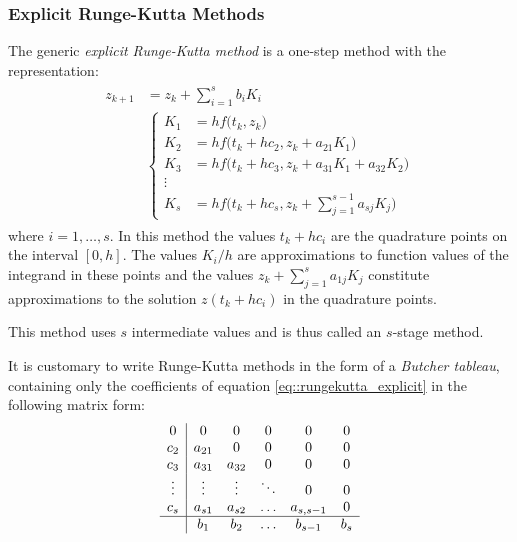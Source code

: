 \subsubsection{Explicit Runge-Kutta Methods}
The generic \textit{explicit Runge-Kutta method} is a one-step method with the representation:
\begin{equation}
	\begin{split}
	\begin{aligned}
		z_{k+1} &= z_k + \sum_{i=1}^{s}b_iK_i \\
		&\begin{cases}
		K_1 &= hf\Big(t_k,z_k\Big) \\[1em]
		K_2 &= hf\Big(t_k+hc_2,z_k + a_{21}K_1\Big) \\[1em]
		K_3 &= hf\Big(t_k+hc_3,z_k + a_{31}K_1 + a_{32}K_2\Big) \\[1em]
		\vdots \\[1em]
		K_s &= hf\Big(t_k+hc_s,z_k + \displaystyle\sum_{j=1}^{s-1}a_{sj}K_j\Big)
		\end{cases}
	\end{aligned}
	\end{split}
	\label{eq::rungekutta_explicit}
\end{equation}
where $i=1,\dots,s$. In this method the values $t_k+hc_i$
are the quadrature points on the interval $[0, h]$.
The values $K_i/h$ are approximations to function values of the
integrand in these points and the values $z_k + \displaystyle\sum_{j=1}^{s}a_{1j}K_j$ constitute
approximations to the solution $z(t_k+hc_i)$ in the quadrature points.

This method uses $s$ intermediate values and is thus called an $s$-stage method.

\begin{definition}
	It is customary to write Runge-Kutta methods in the
	form of a \textit{Butcher tableau}, containing only
	the coefficients of equation \ref{eq::rungekutta_explicit}
	in the following matrix form:
	\begin{equation*}
		\begin{array}
			{c|ccccc}
			0      &  0     & 0      & 0      & 0         & 0 \\
			c_2    & a_{21} & 0      & 0      & 0         & 0 \\
			c_3    & a_{31} & a_{32} & 0      & 0         & 0 \\
			\vdots & \vdots & \vdots & \ddots & 0         & 0 \\
			c_s    & a_{s1} & a_{s2} & \ldots & a_{s,s-1} & 0 \\ \hline
			       & b_1    & b_2    & \ldots & b_{s-1}   & b_s
		\end{array}
	\end{equation*}
\end{definition}

